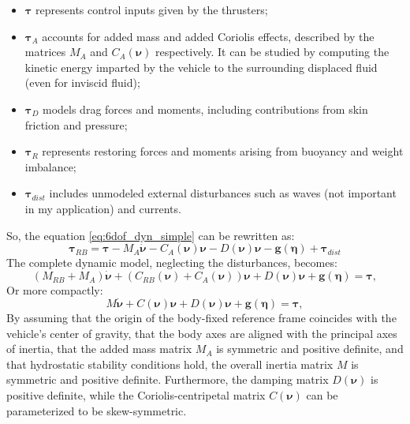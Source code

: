 \begin{itemize}
    \item $\mathbf{\tau}$ represents control inputs given by the thrusters;
    \item $\mathbf{\tau}_{A}$ accounts for added mass and added Coriolis effects, described by the matrices $M_A$ and $C_A(\mathbf{\nu})$ respectively. It
     can be studied by computing the kinetic energy imparted by the vehicle to the surrounding displaced fluid (even for inviscid fluid);
    \item $\mathbf{\tau}_{D}$ models drag forces and moments, including contributions from skin friction and pressure;
    \item $\mathbf{\tau}_{R}$ represents restoring forces and moments arising from buoyancy and weight imbalance;
    \item $\mathbf{\tau}_{dist}$ includes unmodeled external disturbances such as waves (not important in my application) and currents.
\end{itemize}
So, the equation \ref{eq:6dof_dyn_simple} can be rewritten as:
\begin{equation}
    \mathbf{\tau}_{RB} = \mathbf{\tau} - M_A\dot{\mathbf{\nu}}-C_A(\mathbf{\nu})\mathbf{\nu} - D(\mathbf{\nu})\mathbf{\nu} - \mathbf{g}(\mathbf{\eta}) + \mathbf{\tau}_{dist}
    \label{eq:6dof_tau}
\end{equation}
The complete dynamic model, neglecting the disturbances, becomes:
\begin{equation}
    (M_{RB} + M_A)\dot{\mathbf{\nu}} + (C_{RB}(\mathbf{\nu}) + C_A(\mathbf{\nu}))\mathbf{\nu} + D(\mathbf{\nu})\mathbf{\nu} + \mathbf{g}(\mathbf{\eta}) = \mathbf{\tau},
\end{equation}
Or more compactly:
\begin{equation}
    M\dot{\mathbf{\nu}} + C(\mathbf{\nu})\mathbf{\nu} + D(\mathbf{\nu})\mathbf{\nu} + \mathbf{g}(\mathbf{\eta}) = \mathbf{\tau},
    \label{eq:6dof_dyn_complete}
\end{equation}
By assuming that the origin of the body-fixed reference frame coincides with the vehicle's center of gravity, that the body axes are aligned with the principal axes of inertia,
that the added mass matrix $M_A$ is symmetric and positive definite, and that hydrostatic stability conditions hold, the overall inertia matrix $M$ is symmetric and 
positive definite. Furthermore, the damping matrix $D(\mathbf{\nu})$ is positive definite, while the Coriolis-centripetal matrix $C(\mathbf{\nu})$ 
can be parameterized to be skew-symmetric.



